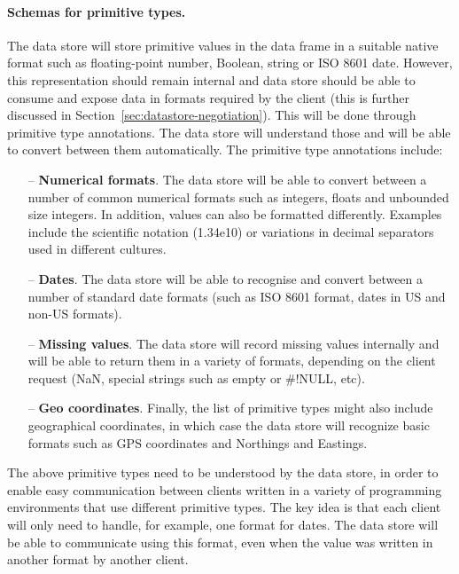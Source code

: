 \documentclass[sigplan,preprint,10pt]{acmart}\settopmatter{printfolios=true,printccs=false,printacmref=false}
\theoremstyle{plain}
\theoremstyle{definition}
\begin{document}
{\paragraph{Schemas for primitive types.} The data store will store primitive values in the
data frame in a suitable native format such as floating-point number, Boolean, string or 
ISO 8601 date. However, this representation should remain internal and data store should be
able to consume and expose data in formats required by the client (this is further discussed
in Section~\ref{sec:datastore-negotiation}). This will be done through primitive type annotations.
The data store will understand those and will be able to convert between them automatically.
The primitive type annotations include:
%
\begin{itemize}
\item[--] \textbf{Numerical formats}. The data store will be able to convert between a number of common numerical
  formats such as integers, floats and unbounded size integers. In addition, values can also be
  formatted differently. Examples include the scientific notation (1.34e10) or variations in 
  decimal separators used in different cultures.
  
\item[--] \textbf{Dates}. The data store will be able to recognise and convert between a number of
  standard date formats (such as ISO 8601 format, dates in US and non-US formats).

\item[--] \textbf{Missing values}. The data store will record missing values internally and will be
  able to return them in a variety of formats, depending on the client request (NaN, special 
  strings such as empty or \#!NULL, etc).
   
\item[--] \textbf{Geo coordinates}. Finally, the list of primitive types might also include geographical
  coordinates, in which case the data store will recognize basic formats such as GPS coordinates
  and Northings and Eastings.  
\end{itemize}

\noindent
The above primitive types need to be understood by the data store, in order to enable easy
communication between clients written in a variety of programming environments that use different
primitive types. The key idea is that each client will only need to handle, for example, one format 
for dates. The data store will be able to communicate using this format, even when the value was
written in another format by another client.

}
\end{document}
